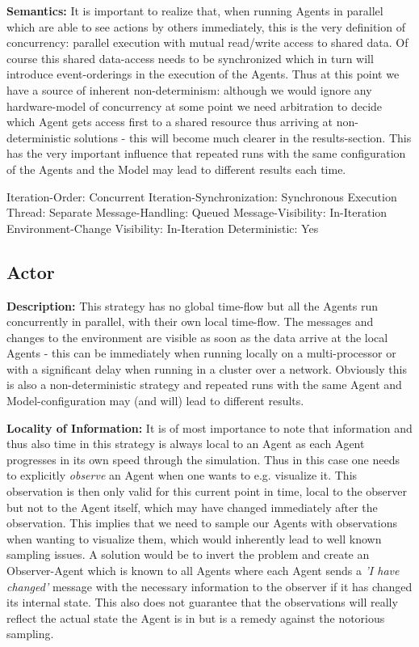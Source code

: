 \textbf{Semantics:} It is important to realize that, when running Agents in parallel which are able to see actions by others immediately, this is the very definition of concurrency: parallel execution with mutual read/write access to shared data. Of course this shared data-access needs to be synchronized which in turn will introduce event-orderings in the execution of the Agents. Thus at this point we have a source of inherent non-determinism: although we would ignore any hardware-model of concurrency at some point we need arbitration to decide which Agent gets access first to a shared resource thus arriving at non-deterministic solutions - this will become much clearer in the results-section. This has the very important influence that repeated runs with the same configuration of the Agents and the Model may lead to different results each time.

	Iteration-Order:			Concurrent
	Iteration-Synchronization: 	Synchronous
	Execution Thread:			Separate
 	Message-Handling:			Queued
 	Message-Visibility:			In-Iteration
 	Environment-Change Visibility:		In-Iteration
 	Deterministic:				Yes

\subsection{Actor}
\textbf{Description:} This strategy has no global time-flow but all the Agents run concurrently in parallel, with their own local time-flow. The messages and changes to the environment are visible as soon as the data arrive at the local Agents - this can be immediately when running locally on a multi-processor or with a significant delay when running in a cluster over a network. Obviously this is also a non-deterministic strategy and repeated runs with the same Agent and Model-configuration may (and will) lead to different results.

\textbf{Locality of Information:} It is of most importance to note that information and thus also time in this strategy is always local to an Agent as each Agent progresses in its own speed through the simulation. Thus in this case one needs to explicitly \textit{observe} an Agent when one wants to e.g. visualize it. This observation is then only valid for this current point in time, local to the observer but not to the Agent itself, which may have changed immediately after the observation. This implies that we need to sample our Agents with observations when wanting to visualize them, which would inherently lead to well known sampling issues. A solution would be to invert the problem and create an Observer-Agent which is known to all Agents where each Agent sends a \textit{'I have changed'} message with the necessary information to the observer if it has changed its internal state. This also does not guarantee that the observations will really reflect the actual state the Agent is in but is a remedy against the notorious sampling. 

